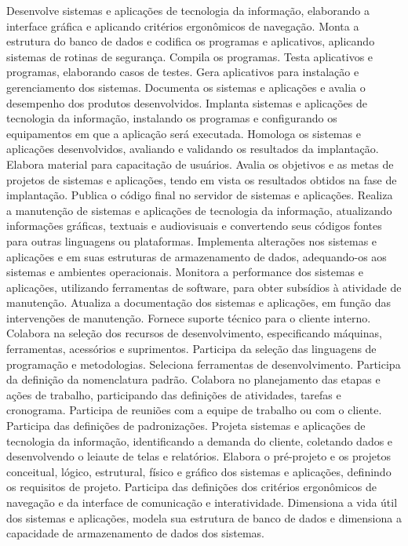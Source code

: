 \documentclass[
]{article}
\begin{document}
Desenvolve sistemas e aplicações de tecnologia da informação, elaborando
a interface gráfica e aplicando critérios ergonômicos de navegação.
Monta a estrutura do banco de dados e codifica os programas e
aplicativos, aplicando sistemas de rotinas de segurança. Compila os
programas. Testa aplicativos e programas, elaborando casos de testes.
Gera aplicativos para instalação e gerenciamento dos sistemas. Documenta
os sistemas e aplicações e avalia o desempenho dos produtos
desenvolvidos. Implanta sistemas e aplicações de tecnologia da
informação, instalando os programas e configurando os equipamentos em
que a aplicação será executada. Homologa os sistemas e aplicações
desenvolvidos, avaliando e validando os resultados da implantação.
Elabora material para capacitação de usuários. Avalia os objetivos e as
metas de projetos de sistemas e aplicações, tendo em vista os resultados
obtidos na fase de implantação. Publica o código final no servidor de
sistemas e aplicações. Realiza a manutenção de sistemas e aplicações de
tecnologia da informação, atualizando informações gráficas, textuais e
audiovisuais e convertendo seus códigos fontes para outras linguagens ou
plataformas. Implementa alterações nos sistemas e aplicações e em suas
estruturas de armazenamento de dados, adequando-os aos sistemas e
ambientes operacionais. Monitora a performance dos sistemas e
aplicações, utilizando ferramentas de software, para obter subsídios à
atividade de manutenção. Atualiza a documentação dos sistemas e
aplicações, em função das intervenções de manutenção. Fornece suporte
técnico para o cliente interno. Colabora na seleção dos recursos de
desenvolvimento, especificando máquinas, ferramentas, acessórios e
suprimentos. Participa da seleção das linguagens de programação e
metodologias. Seleciona ferramentas de desenvolvimento. Participa da
definição da nomenclatura padrão. Colabora no planejamento das etapas e
ações de trabalho, participando das definições de atividades, tarefas e
cronograma. Participa de reuniões com a equipe de trabalho ou com o
cliente. Participa das definições de padronizações. Projeta sistemas e
aplicações de tecnologia da informação, identificando a demanda do
cliente, coletando dados e desenvolvendo o leiaute de telas e
relatórios. Elabora o pré-projeto e os projetos conceitual, lógico,
estrutural, físico e gráfico dos sistemas e aplicações, definindo os
requisitos de projeto. Participa das definições dos critérios
ergonômicos de navegação e da interface de comunicação e interatividade.
Dimensiona a vida útil dos sistemas e aplicações, modela sua estrutura
de banco de dados e dimensiona a capacidade de armazenamento de dados
dos sistemas.
\end{document}
